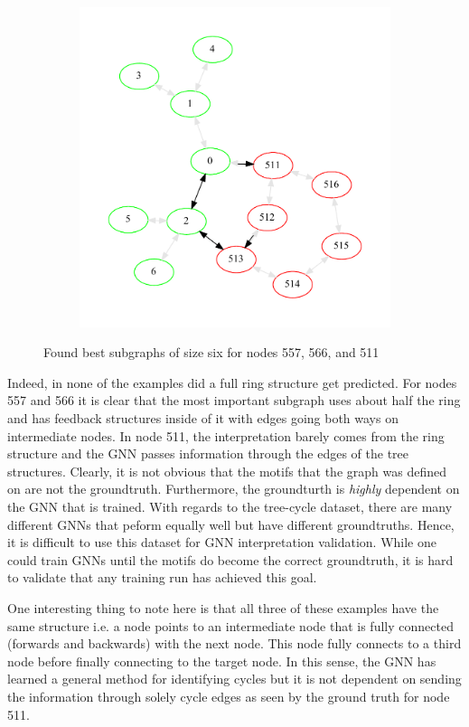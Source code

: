 \begin{figure}[H]
\begin{subfigure}{0.49\textwidth}
		\includegraphics[width=0.95\linewidth]{images/tree-cycles-511.pdf}
	\end{subfigure}
	\caption{Found best subgraphs of size six for nodes 557, 566, and 511}
	\label{fig:tree-cycles-gt}
\end{figure}

Indeed, in none of the examples did a full ring structure get predicted. For nodes 557 and 566 it is clear that the most important subgraph uses about half the ring and has feedback structures inside of it with edges going both ways on intermediate nodes. In node 511, the interpretation barely comes from the ring structure and the GNN passes information through the edges of the tree structures. Clearly, it is not obvious that the motifs that the graph was defined on are not the groundtruth. Furthermore, the groundturth is \textit{highly} dependent on the GNN that is trained. With regards to the tree-cycle dataset, there are many different GNNs that peform equally well but have different groundtruths. Hence, it is difficult to use this dataset for GNN interpretation validation. While one could train GNNs until the motifs do become the correct groundtruth, it is hard to validate that any training run has achieved this goal.

One interesting thing to note here is that all three of these examples have the same structure i.e. a node points to an intermediate node that is fully connected (forwards and backwards) with the next node. This node fully connects to a third node before finally connecting to the target node. In this sense, the GNN has learned a general method for identifying cycles but it is not dependent on sending the information through solely cycle edges as seen by the ground truth for node 511.

